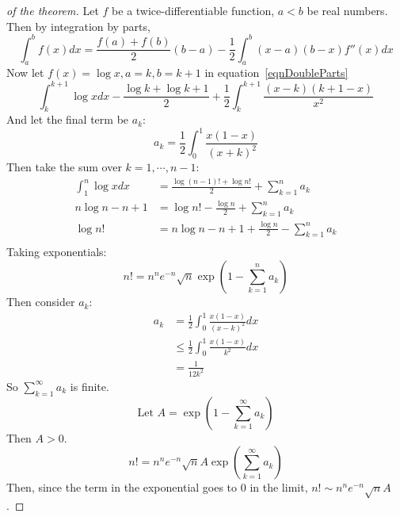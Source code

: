 \documentclass[../Main.tex]{subfiles}
\begin{document}
\begin{proof}[of the theorem]
    Let $f$ be a twice-differentiable function, $a < b$ be real numbers. Then by integration by parts,
    \begin{equation}
        \int_{a}^{b} f(x) dx = \frac{f(a) + f(b)}{2} (b - a) - \frac{1}{2} \int_a^b (x - a)(b - x)f''(x)dx
        \label{eqnDoubleParts}
    \end{equation}
    Now let $f(x) = \log{x}, a = k, b = k + 1$ in equation~\ref{eqnDoubleParts}
    \begin{equation*}
        \int_k^{k+1} \log{x} dx - \frac{\log{k} + \log{k + 1}}{2} + \frac{1}{2} \int_k^{k + 1} \frac{(x - k)(k + 1 - x)}{x^2}
    \end{equation*}
    And let the final term be $a_k$:
    \begin{equation*}
        a_k = \frac{1}{2} \int_0^1 \frac{x(1-x)}{(x + k)^2}
    \end{equation*}
    Then take the sum over $k = 1, \cdots, n-1$:
    \begin{align*}
        \int_1^n \log{x} dx &= \frac{\log{(n - 1)!} + \log{n!}}{2} + \sum_{k=1}^{n} a_k \\
        n \log{n} - n + 1 &= \log{n!} - \frac{\log{n}}{2} + \sum_{k=1}^{n} a_k \\
        \log{n!} &= n \log{n} - n + 1 + \frac{\log{n}}{2} - \sum_{k=1}^{n} a_k \\
    \end{align*}
    Taking exponentials:
    \begin{equation*}
        n! = n^n e^{-n} \sqrt{n} \exp{\left(1 - \sum_{k=1}^{n} a_k\right)}
    \end{equation*}
    Then consider $a_k$:
    \begin{align*}
        a_k &= \frac{1}{2}\int_0^1 \frac{x(1-x)}{(x-k)^2} dx \\
        &\leq \frac{1}{2} \int_0^1 \frac{x(1-x)}{k^2} dx \\
        &= \frac{1}{12k^2}
    \end{align*}
    So $\sum_{k=1}^{\infty} a_k$ is finite.
    \begin{equation*}
        \text{Let } A = \exp{\left(1 - \sum_{k=1}^{\infty} a_k\right)}
    \end{equation*}
    Then $A > 0$.
    \begin{equation*}
        n! = n^n e^{-n} \sqrt{n} A \exp{\left(\sum_{k=1}^{\infty} a_k\right)}
    \end{equation*}
    Then, since the term in the exponential goes to $0$ in the limit, $n! \sim n^n e^{-n} \sqrt{n} A$.

\end{proof}
\end{document}
